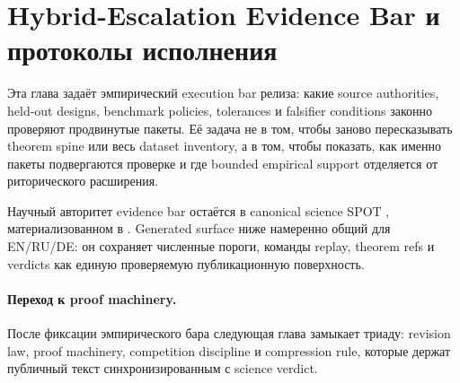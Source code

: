 \section{Hybrid-Escalation Evidence Bar и протоколы исполнения}
\label{sec:oc-core-1-3-empirical-execution-protocols-ru}

Эта глава задаёт эмпирический execution bar релиза: какие source authorities,
held-out designs, benchmark policies, tolerances и falsifier conditions
законно проверяют продвинутые пакеты. Её задача не в том, чтобы заново
пересказывать theorem spine или весь dataset inventory, а в том, чтобы
показать, как именно пакеты подвергаются проверке и где bounded empirical
support отделяется от риторического расширения.

Научный авторитет evidence bar остаётся в canonical science SPOT
, материализованном в
.
Generated surface ниже намеренно общий для EN/RU/DE: он сохраняет численные
пороги, команды replay, theorem refs и verdicts как единую проверяемую
публикационную поверхность.

\begingroup
\small

\endgroup

\paragraph{Переход к proof machinery.}
После фиксации эмпирического бара следующая глава замыкает триаду: revision
law, proof machinery, competition discipline и compression rule, которые
держат публичный текст синхронизированным с science verdict.
